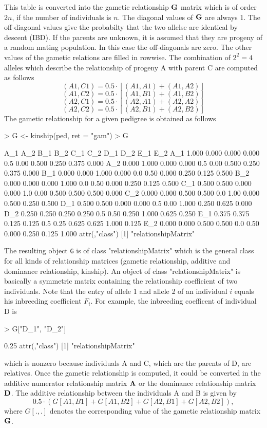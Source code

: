 \documentclass[a4paper,11pt]{article}
\begin{document}
This table is converted into the gametic relationship $\bf G$ matrix which is of order $2n$, if the number of individuals is $n$. The diagonal values of $\bf G$ are always 1. The off-diagonal values give the probabilty that the two allelse are identical by
descent (IBD). If the parents are unknown, it is assumed that they are progeny of a random mating population. In this case the off-diagonals are zero. The other values of the gametic relations are filled in rowwise. 
The combination of $2^2=4$ alleles which describe the relationship of progeny A with parent C are computed as follows
$$ (A1,C1) = 0.5 \cdot [(A1,A1) + (A1,A2)] $$
$$ (A1,C2) = 0.5 \cdot [(A1,B1) + (A1,B2)] $$
$$ (A2,C1) = 0.5 \cdot [(A2,A1) + (A2,A2)] $$
$$ (A2,C2) = 0.5 \cdot [(A2,B1) + (A2,B2)] $$
The gametic relationship for a given pedigree is obtained as follows
\begin{Schunk}
\begin{Sinput}
> G <- kinship(ped, ret = "gam")
> G
\end{Sinput}
\begin{Soutput}
      A_1   A_2   B_1   B_2 C_1  C_2   D_1   D_2   E_1   E_2
A_1 1.000 0.000 0.000 0.000 0.5 0.00 0.500 0.250 0.375 0.000
A_2 0.000 1.000 0.000 0.000 0.5 0.00 0.500 0.250 0.375 0.000
B_1 0.000 0.000 1.000 0.000 0.0 0.50 0.000 0.250 0.125 0.500
B_2 0.000 0.000 0.000 1.000 0.0 0.50 0.000 0.250 0.125 0.500
C_1 0.500 0.500 0.000 0.000 1.0 0.00 0.500 0.500 0.500 0.000
C_2 0.000 0.000 0.500 0.500 0.0 1.00 0.000 0.500 0.250 0.500
D_1 0.500 0.500 0.000 0.000 0.5 0.00 1.000 0.250 0.625 0.000
D_2 0.250 0.250 0.250 0.250 0.5 0.50 0.250 1.000 0.625 0.250
E_1 0.375 0.375 0.125 0.125 0.5 0.25 0.625 0.625 1.000 0.125
E_2 0.000 0.000 0.500 0.500 0.0 0.50 0.000 0.250 0.125 1.000
attr(,"class")
[1] "relationshipMatrix"
\end{Soutput}
\end{Schunk}
The resulting object \texttt{G} is of class "relationshipMatrix" which is the general class for all kinds of relationship matrices (gametic relationship, additive and dominance relationship, kinship). An object of class "relationshipMatrix" is basically a symmetric matrix containing the relationship coefficient of two individuals.
Note that the entry of allele 1 and allele 2 of an individual $i$ equals his inbreeding coefficient $F_i$. For example, the inbreeding coefficent of individual D is
\begin{Schunk}
\begin{Sinput}
> G["D_1", "D_2"]
\end{Sinput}
\begin{Soutput}
[1] 0.25
attr(,"class")
[1] "relationshipMatrix"
\end{Soutput}
\end{Schunk}
which is nonzero because individuals A and C, which are the parents of D, are relatives. Once the gametic relationship is computed, it could be converted in the additive numerator relationship matrix $\bf A$ or the dominance relationship matrix $\bf D$. The additive relationship between the individuals A and B is given by
$$ 0.5 \cdot (G[A1,B1]+ G[A1,B2] + G[A2,B1] + G[A2,B2]),$$
where $G[.,.]$ denotes the corresponding value of the gametic relationship matrix $\bf G$. 
\end{document}
